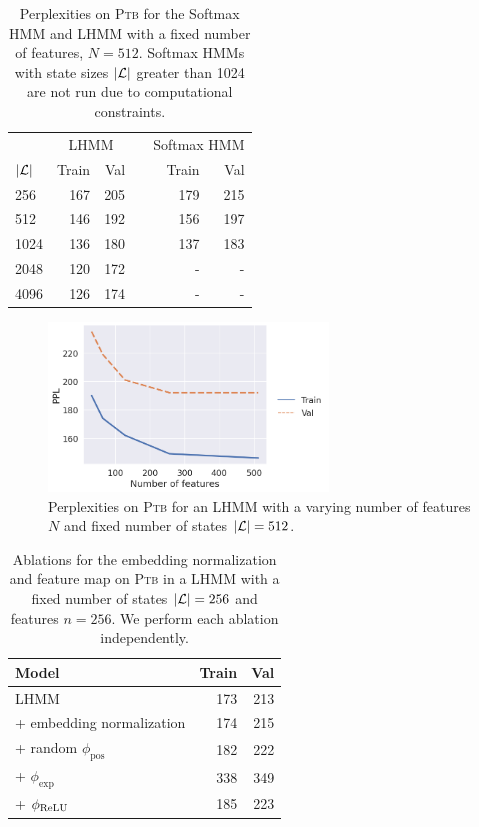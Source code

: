 \documentclass{article}
\begin{document}
\begin{table}[!t]
\centering
\begin{tabular}{lrrcrr}
\toprule
& \multicolumn{2}{c}{LHMM} && \multicolumn{2}{c}{Softmax HMM}\\
\cmidrule{2-3} \cmidrule{5-6}
$|\mathcal{L}|$ & Train & Val && Train & Val\\
\midrule
256  & 167 & 205 && 179 & 215\\
512  & 146 & 192 && 156 & 197\\
1024 & 136 & 180 && 137 & 183 \\
2048 & 120 & 172 && -   & -\\
4096 & 126 & 174 && -   & - \\
\bottomrule
\end{tabular}
\caption{\label{tbl:hmm-ppl-states}
Perplexities on \textsc{Ptb} for the Softmax HMM and LHMM with a fixed number of features, $N = 512$.
Softmax HMMs with state sizes $|\mathcal{L}|$ greater than 1024 are not run due to computational constraints.
}
\end{table}

\begin{figure}[t]
\centering
\includegraphics[height=4.5cm]{imgs/hmm/hmm-ppl-features.png}
\caption{
\label{fig:hmm-ppl-features}
Perplexities on \textsc{Ptb} for an LHMM with a varying number of features $N$ and fixed number of states $|\mathcal{L}|=512$.
}
\end{figure}

\begin{table}[!t]
\centering
\begin{tabular}{lrr}
\toprule
Model & Train & Val \\
\midrule
LHMM                         & 173 & 213\\
\quad + embedding normalization      & 174 & 215 \\
\quad + random $\phi_\textrm{pos}$ & 182 & 222\\
\quad + $\phi_{\exp}$              & 338 & 349\\
\quad + $\phi_{\mathrm{ReLU}}$               & 185 & 223\\
\bottomrule
\end{tabular}
\caption{\label{tbl:hmm-ablation}
Ablations for the embedding normalization and feature map on \textsc{Ptb} in a LHMM with a fixed number of states $|\mathcal{L}| = 256$ and features $n=256$.
We perform each ablation independently.
}
\end{table}
\end{document}
